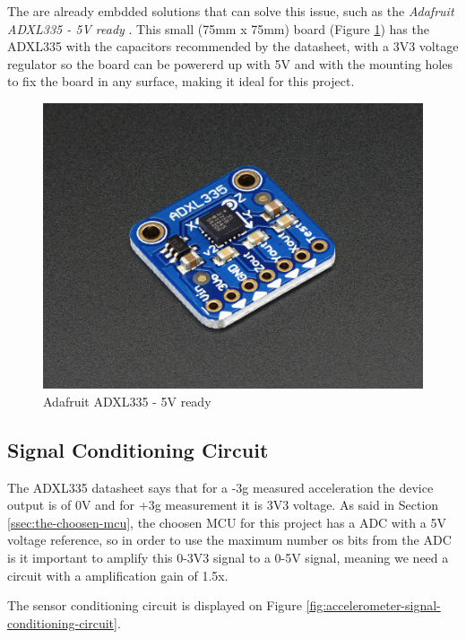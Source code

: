	The are already embdded solutions that can solve this issue, such as the \textit{Adafruit ADXL335 - 5V ready} \cite{adafruit-5v-ready}. This small (75mm x 75mm) board (Figure \ref{fig:adafruit-adxl335}) has the ADXL335 with the capacitors recommended by the datasheet, with a 3V3 voltage regulator so the board can be powererd up with 5V and with the mounting holes to fix the board in any surface, making it ideal for this project.

	\begin{figure}[htbp]
		\centering
			\includegraphics[scale=0.2]{figuras/fig-adafruit-adxl335.jpg}
		\caption{Adafruit ADXL335 - 5V ready \cite{adafruit-adxl335}}
		\label{fig:adafruit-adxl335}
	\end{figure}


\subsection{Signal Conditioning Circuit}\label{ssec:accelerometer-signal-conditioning-circuit}

	The ADXL335 datasheet \cite{devices2010adxl335} says that for a -3g measured acceleration the device output is of 0V and for +3g measurement it is 3V3 voltage. As said in Section \ref{ssec:the-choosen-mcu}, the choosen MCU for this project has a ADC with a 5V voltage reference, so in order to use the maximum number os bits from the ADC is it important to amplify this 0-3V3 signal to a 0-5V signal, meaning we need a circuit with a amplification gain of 1.5x.
	\par
	The sensor conditioning circuit is displayed on Figure \ref{fig:accelerometer-signal-conditioning-circuit}.

